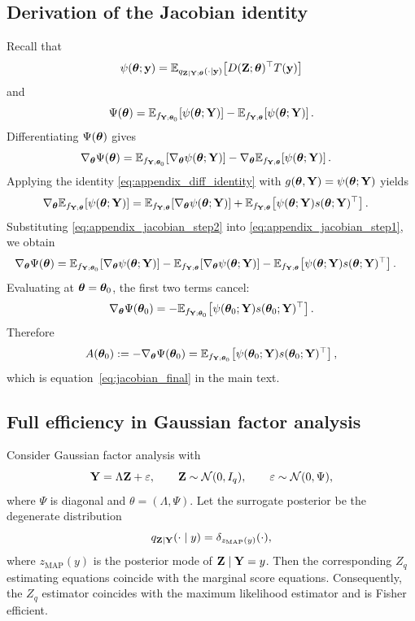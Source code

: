 \documentclass[twoside,11pt]{article}
\begin{document}
\subsection{Derivation of the Jacobian identity}
\label{apx:jacobian}

Recall that
\[
\psi({\bm{\theta}};{\bf y})
=
\mathbb E_{q_{{\bf Z}\mid{\bf Y};{\bm{\theta}}}(\cdot\mid {\bf y})}
\!\left[
D({\bf Z};{\bm{\theta}})^\top T({\bf y})
\right]
\]
and
\[
\Psi({\bm{\theta}})
=
\mathbb E_{f_{{\bf Y};{\bm{\theta}}_0}}\!\left[\psi({\bm{\theta}};{\bf Y})\right]
-
\mathbb E_{f_{{\bf Y};{\bm{\theta}}}}\!\left[\psi({\bm{\theta}};{\bf Y})\right].
\]
Differentiating \(\Psi({\bm{\theta}})\) gives
\begin{align}
\nabla_{\bm{\theta}} \Psi({\bm{\theta}})
&=
\mathbb E_{f_{{\bf Y};{\bm{\theta}}_0}}\!\left[\nabla_{\bm{\theta}} \psi({\bm{\theta}};{\bf Y})\right]
-
\nabla_{\bm{\theta}} \mathbb E_{f_{{\bf Y};{\bm{\theta}}}}\!\left[\psi({\bm{\theta}};{\bf Y})\right].
\label{eq:appendix_jacobian_step1}
\end{align}
Applying the identity \eqref{eq:appendix_diff_identity} with \(g({\bm{\theta}},{\bf Y})=\psi({\bm{\theta}};{\bf Y})\) yields
\begin{align}
\nabla_{\bm{\theta}} \mathbb E_{f_{{\bf Y};{\bm{\theta}}}}\!\left[\psi({\bm{\theta}};{\bf Y})\right]
&=
\mathbb E_{f_{{\bf Y};{\bm{\theta}}}}\!\left[\nabla_{\bm{\theta}} \psi({\bm{\theta}};{\bf Y})\right]
+
\mathbb E_{f_{{\bf Y};{\bm{\theta}}}}\!\left[\psi({\bm{\theta}};{\bf Y})s({\bm{\theta}};{\bf Y})^\top\right].
\label{eq:appendix_jacobian_step2}
\end{align}
Substituting \eqref{eq:appendix_jacobian_step2} into \eqref{eq:appendix_jacobian_step1}, we obtain
\begin{align}
\nabla_{\bm{\theta}} \Psi({\bm{\theta}})
&=
\mathbb E_{f_{{\bf Y};{\bm{\theta}}_0}}\!\left[\nabla_{\bm{\theta}} \psi({\bm{\theta}};{\bf Y})\right]
-
\mathbb E_{f_{{\bf Y};{\bm{\theta}}}}\!\left[\nabla_{\bm{\theta}} \psi({\bm{\theta}};{\bf Y})\right]
-
\mathbb E_{f_{{\bf Y};{\bm{\theta}}}}\!\left[\psi({\bm{\theta}};{\bf Y})s({\bm{\theta}};{\bf Y})^\top\right].
\end{align}
Evaluating at \({\bm{\theta}}={\bm{\theta}}_0\), the first two terms cancel:
\[
\nabla_{\bm{\theta}} \Psi({\bm{\theta}}_0)
=
-
\mathbb E_{f_{{\bf Y};{\bm{\theta}}_0}}\!\left[\psi({\bm{\theta}}_0;{\bf Y})s({\bm{\theta}}_0;{\bf Y})^\top\right].
\]
Therefore
\[
A({\bm{\theta}}_0)
:=
-\nabla_{\bm{\theta}} \Psi({\bm{\theta}}_0)
=
\mathbb E_{f_{{\bf Y};{\bm{\theta}}_0}}\!\left[\psi({\bm{\theta}}_0;{\bf Y})s({\bm{\theta}}_0;{\bf Y})^\top\right],
\]
which is equation~\eqref{eq:jacobian_final} in the main text.

\subsection{Full efficiency in Gaussian factor analysis}
\label{apx:fa-efficiency}

\begin{proposition}
\label{prop:fa-efficiency}
Consider Gaussian factor analysis with
\[
{\bf Y} = \Lambda {\bf Z} + \varepsilon,
\qquad
{\bf Z} \sim \mathcal N(0,I_q),
\qquad
\varepsilon \sim \mathcal N(0,\Psi),
\]
where \(\Psi\) is diagonal and \(\theta=(\Lambda,\Psi)\). Let the surrogate posterior be the degenerate distribution
\[
q_{{\bf Z}\mid{\bf Y}}(\cdot\mid y)=\delta_{z_{\mathrm{MAP}}(y)}(\cdot),
\]
where \(z_{\mathrm{MAP}}(y)\) is the posterior mode of \({\bf Z}\mid {\bf Y}=y\). Then the corresponding \(Z_q\) estimating equations coincide with the marginal score equations. Consequently, the \(Z_q\) estimator coincides with the maximum likelihood estimator and is Fisher efficient.
\end{proposition}
\end{document}
